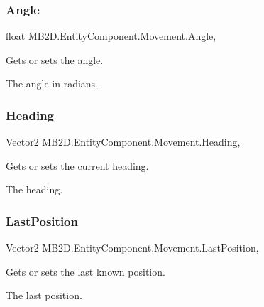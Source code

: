 \subsubsection{\texorpdfstring{Angle}{Angle}}
{\footnotesize\ttfamily float M\+B2\+D.\+Entity\+Component.\+Movement.\+Angle\hspace{0.3cm}{\ttfamily [get]}, {\ttfamily [set]}}



Gets or sets the angle. 

The angle in radians.\hypertarget{class_m_b2_d_1_1_entity_component_1_1_movement_adeedf6c11648bd487a6a7e75cc7848e3}{}\label{class_m_b2_d_1_1_entity_component_1_1_movement_adeedf6c11648bd487a6a7e75cc7848e3} 
\subsubsection{\texorpdfstring{Heading}{Heading}}
{\footnotesize\ttfamily Vector2 M\+B2\+D.\+Entity\+Component.\+Movement.\+Heading\hspace{0.3cm}{\ttfamily [get]}, {\ttfamily [set]}}



Gets or sets the current heading. 

The heading.\hypertarget{class_m_b2_d_1_1_entity_component_1_1_movement_aa9fc1e316492a6b72084d5c7f88786e7}{}\label{class_m_b2_d_1_1_entity_component_1_1_movement_aa9fc1e316492a6b72084d5c7f88786e7} 
\subsubsection{\texorpdfstring{Last\+Position}{LastPosition}}
{\footnotesize\ttfamily Vector2 M\+B2\+D.\+Entity\+Component.\+Movement.\+Last\+Position\hspace{0.3cm}{\ttfamily [get]}, {\ttfamily [set]}}



Gets or sets the last known position. 

The last position.\hypertarget{class_m_b2_d_1_1_entity_component_1_1_movement_a7b94bcfe9d86cd611ef0c5b4afe6b426}{}\label{class_m_b2_d_1_1_entity_component_1_1_movement_a7b94bcfe9d86cd611ef0c5b4afe6b426} 
